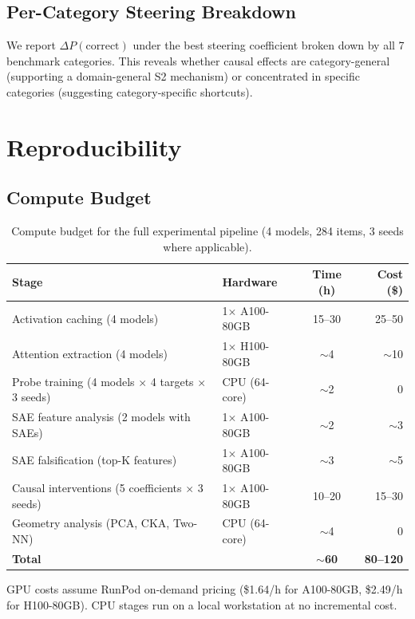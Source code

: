 \subsection{Per-Category Steering Breakdown}

We report $\Delta P(\text{correct})$ under the best steering coefficient
broken down by all 7 benchmark categories.  This reveals whether causal
effects are category-general (supporting a domain-general S2 mechanism) or
concentrated in specific categories (suggesting category-specific shortcuts).

\section{Reproducibility}
\label{app:reproducibility}

\subsection{Compute Budget}

\begin{table}[h]
\centering
\caption{Compute budget for the full experimental pipeline (4 models,
  284 items, 3 seeds where applicable).}
\label{tab:compute}
\small
\begin{tabular}{llcr}
\toprule
\textbf{Stage} & \textbf{Hardware} & \textbf{Time (h)} & \textbf{Cost (\$)} \\
\midrule
Activation caching (4 models) & 1$\times$ A100-80GB & 15--30 & 25--50 \\
Attention extraction (4 models) & 1$\times$ H100-80GB & $\sim$4 & $\sim$10 \\
Probe training (4 models $\times$ 4 targets $\times$ 3 seeds) & CPU (64-core) & $\sim$2 & 0 \\
SAE feature analysis (2 models with SAEs) & 1$\times$ A100-80GB & $\sim$2 & $\sim$3 \\
SAE falsification (top-K features) & 1$\times$ A100-80GB & $\sim$3 & $\sim$5 \\
Causal interventions (5 coefficients $\times$ 3 seeds) & 1$\times$ A100-80GB & 10--20 & 15--30 \\
Geometry analysis (PCA, CKA, Two-NN) & CPU (64-core) & $\sim$4 & 0 \\
\midrule
\textbf{Total} & & $\sim$\textbf{60} & \textbf{80--120} \\
\bottomrule
\end{tabular}
\vspace{2pt}
\raggedright
\footnotesize{GPU costs assume RunPod on-demand pricing (\$1.64/h for
A100-80GB, \$2.49/h for H100-80GB).  CPU stages run on a local workstation
at no incremental cost.}
\end{table}

